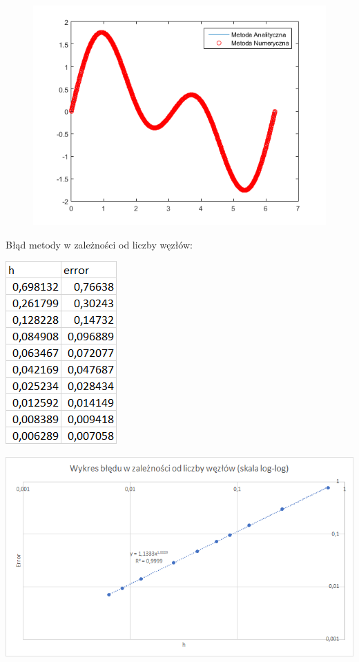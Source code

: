 \begin{figure}[!ht]
	\begin{center}
		\includegraphics[width=1\textwidth]{Lab3/charts/zad1/1000.png}
	\end{center}
\end{figure}

\newpage

Błąd metody w zależności od liczby węzłów:

\includegraphics{Lab3/charts/zad1/error_dane.png}

\includegraphics{Lab3/charts/zad1/error.png}

